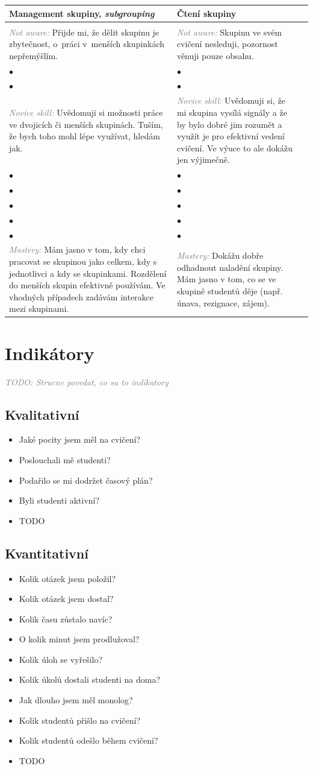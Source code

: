 \documentclass[twoside,openany,10pt]{book}
\makeatletter
\newcommand{\note}[1]{\textcolor{gray}{\small\itshape #1}}
\newcommand{\rubricpage}[8]{
\newpage
\begin{tabular}{@{}>{\small}C{0.48\textwidth}>{\small}C{0.48\textwidth}@{}l@{}}
\normalsize \bfseries #1 & \normalsize \bfseries #5 & \\[1em] \hline \\[-1.2em]
	\justify \note{Not aware:} #2 & \justify \note{Not aware:} #6 & \\[2em]
$\bullet$ & $\bullet$ & \\
$\bullet$ & $\bullet$ & \\
\justify \note{Novice skill:} #3 & \justify \note{Novice skill:} #7 & \\[3em]
$\bullet$ & $\bullet$ & \\
$\bullet$ & $\bullet$ & \\
$\bullet$ & $\bullet$ & \\
$\bullet$ & $\bullet$ & \\
$\bullet$ & $\bullet$ & \\
\justify \note{Mastery:} #4 & \justify \note{Mastery:} #8 &
\end{tabular}
}
\makeatother
\begin{document}
\rubricpage{Management skupiny, \textit{subgrouping}}
{Přijde mi, že dělit skupinu je zbytečnost, o~práci v~menších skupinkách nepřemýšlím.}
{Uvědomuji si možnosti práce ve dvojicích či menších skupinách. Tuším, že bych toho mohl lépe využívat, hledám jak.}
{Mám jasno v tom, kdy chci pracovat se skupinou jako celkem, kdy s jednotlivci a kdy se skupinkami. Rozdělení do menších skupin efektivně používám. Ve vhodných případech zadávám interakce mezi skupinami.}
{Čtení skupiny}
{Skupinu ve svém cvičení nesleduji, pozornost věnuji pouze obsahu.}
{Uvědomuji si, že mi skupina vysílá signály a že by bylo dobré jim rozumět a využít je pro efektivní vedení cvičení. Ve výuce to ale dokážu jen výjimečně.}
{Dokážu dobře odhadnout naladění skupiny. Mám jasno v tom, co se ve skupině studentů děje (např. únava, rezignace, zájem).}

\chapter*{Indikátory}
\label{indikatory}
\vspace{-0.5em}
\note{TODO: Strucne povedat, co su to indikatory}

\section*{Kvalitativní}
\begin{itemize}
\item Jaké pocity jsem měl na cvičení?
\item Poslouchali mě studenti?
\item Podařilo se mi dodržet časový plán?
\item Byli studenti aktivní?
\item TODO
\end{itemize}

\section*{Kvantitativní}
\begin{itemize}
\item Kolik otázek jsem položil?
\item Kolik otázek jsem dostal?
\item Kolik času zůstalo navíc?
\item O kolik minut jsem prodlužoval?
\item Kolik úloh se vyřešilo?
\item Kolik úkolů dostali studenti na doma?
\item Jak dlouho jsem měl monolog?
\item Kolik studentů přišlo na cvičení?
\item Kolik studentů odešlo během cvičení?
\item TODO
\end{itemize}
\newpage
\end{document}
